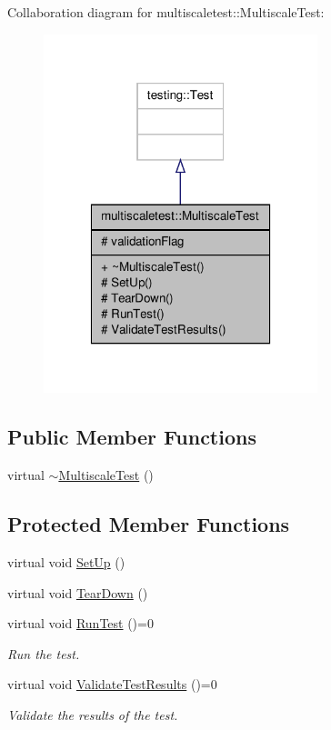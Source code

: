 Collaboration diagram for multiscaletest\-:\-:Multiscale\-Test\-:\nopagebreak
\begin{figure}[H]
\begin{center}
\leavevmode
\includegraphics[width=226pt]{classmultiscaletest_1_1MultiscaleTest__coll__graph}
\end{center}
\end{figure}
\subsection*{Public Member Functions}
\begin{DoxyCompactItemize}
\item 
virtual \hyperlink{classmultiscaletest_1_1MultiscaleTest_a27aa0fd218670e2265edad84b2fb1f8f}{$\sim$\-Multiscale\-Test} ()
\end{DoxyCompactItemize}
\subsection*{Protected Member Functions}
\begin{DoxyCompactItemize}
\item 
virtual void \hyperlink{classmultiscaletest_1_1MultiscaleTest_ae2aca36167fd45b7ad41a62959fa2d7b}{Set\-Up} ()
\item 
virtual void \hyperlink{classmultiscaletest_1_1MultiscaleTest_a189153640670abf1819ae8d71899aa94}{Tear\-Down} ()
\item 
virtual void \hyperlink{classmultiscaletest_1_1MultiscaleTest_a3b3c62b74e1fd1eb0633f9b720659ce3}{Run\-Test} ()=0
\begin{DoxyCompactList}\small\item\em Run the test. \end{DoxyCompactList}\item 
virtual void \hyperlink{classmultiscaletest_1_1MultiscaleTest_a571838b9aa291a62da67733e39268871}{Validate\-Test\-Results} ()=0
\begin{DoxyCompactList}\small\item\em Validate the results of the test. \end{DoxyCompactList}\end{DoxyCompactItemize}
